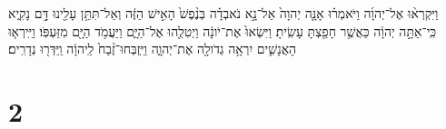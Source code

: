 \documentclass{openreader}
\begin{document}
וַיִּקְרְא֨וּ אֶל־יְהוָ֜ה וַיֹּאמְר֗וּ אָנָּ֤ה יְהוָה֙ אַל־נָ֣א נֹאבְדָ֗ה בְּנֶ֨פֶשׁ֙ הָאִ֣ישׁ הַזֶּ֔ה וְאַל־תִּתֵּ֥ן עָלֵ֖ינוּ דָּ֣ם נָקִ֑יא כִּֽי־אַתָּ֣ה יְהוָ֔ה כַּאֲשֶׁ֥ר חָפַ֖צְתָּ עָשִֽׂיתָ׃ וַיִּשְׂאוּ֙ אֶת־יֹונָ֔ה וַיְטִלֻ֖הוּ אֶל־הַיָּ֑ם וַיַּעֲמֹ֥ד הַיָּ֖ם מִזַּעְפֹּֽו׃ וַיִּֽירְא֧וּ הָאֲנָשִׁ֛ים יִרְאָ֥ה גְדֹולָ֖ה אֶת־יְהוָ֑ה וַיִּֽזְבְּחוּ־זֶ֨בַח֙ לַֽיהוָ֔ה וַֽיִּדְּר֖וּ נְדָרִֽים׃ \section*{2}
\end{document}
